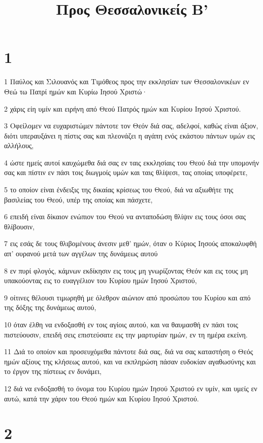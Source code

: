 

\title{Προς Θεσσαλονικείς Β'}


\chapter{1}

\par 1 Παύλος και Σιλουανός και Τιμόθεος προς την εκκλησίαν των Θεσσαλονικέων εν Θεώ τω Πατρί ημών και Κυρίω Ιησού Χριστώ·
\par 2 χάρις είη υμίν και ειρήνη από Θεού Πατρός ημών και Κυρίου Ιησού Χριστού.
\par 3 Οφείλομεν να ευχαριστώμεν πάντοτε τον Θεόν διά σας, αδελφοί, καθώς είναι άξιον, διότι υπεραυξάνει η πίστις σας και πλεονάζει η αγάπη ενός εκάστου πάντων υμών εις αλλήλους,
\par 4 ώστε ημείς αυτοί καυχώμεθα διά σας εν ταις εκκλησίαις του Θεού διά την υπομονήν σας και πίστιν εν πάσι τοις διωγμοίς υμών και ταις θλίψεσι, τας οποίας υποφέρετε,
\par 5 το οποίον είναι ένδειξις της δικαίας κρίσεως του Θεού, διά να αξιωθήτε της βασιλείας του Θεού, υπέρ της οποίας και πάσχετε,
\par 6 επειδή είναι δίκαιον ενώπιον του Θεού να ανταποδώση θλίψιν εις τους όσοι σας θλίβουσιν,
\par 7 εις εσάς δε τους θλιβομένους άνεσιν μεθ' ημών, όταν ο Κύριος Ιησούς αποκαλυφθή απ' ουρανού μετά των αγγέλων της δυνάμεως αυτού
\par 8 εν πυρί φλογός, κάμνων εκδίκησιν εις τους μη γνωρίζοντας Θεόν και εις τους μη υπακούοντας εις το ευαγγέλιον του Κυρίου ημών Ιησού Χριστού,
\par 9 οίτινες θέλουσι τιμωρηθή με όλεθρον αιώνιον από προσώπου του Κυρίου και από της δόξης της δυνάμεως αυτού,
\par 10 όταν έλθη να ενδοξασθή εν τοις αγίοις αυτού, και να θαυμασθή εν πάσι τοις πιστεύουσιν, επειδή σεις επιστεύσατε εις την μαρτυρίαν ημών, εν τη ημέρα εκείνη.
\par 11 Διά το οποίον και προσευχόμεθα πάντοτε διά σας, διά να σας καταστήση ο Θεός ημών αξίους της κλήσεως αυτού, και να εκπληρώση πάσαν ευδοκίαν αγαθωσύνης και το έργον της πίστεως εν δυνάμει,
\par 12 διά να ενδοξασθή το όνομα του Κυρίου ημών Ιησού Χριστού εν υμίν, και υμείς εν αυτώ, κατά την χάριν του Θεού ημών και Κυρίου Ιησού Χριστού.

\chapter{2}

